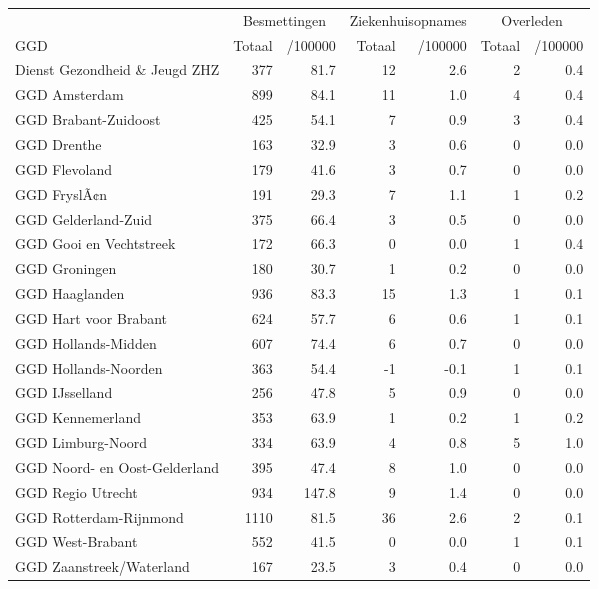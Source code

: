 \documentclass[
  english,
  man,floatsintext]{apa6}
\begin{document}
\begin{table}
\centering\begingroup\fontsize{10}{12}\selectfont

\begin{threeparttable}
\begin{tabular}{lrrrrrr}
\toprule
\multicolumn{1}{c}{ } & \multicolumn{2}{c}{Besmettingen} & \multicolumn{2}{c}{Ziekenhuisopnames} & \multicolumn{2}{c}{Overleden} \\
\cmidrule(l{3pt}r{3pt}){2-3} \cmidrule(l{3pt}r{3pt}){4-5} \cmidrule(l{3pt}r{3pt}){6-7}
GGD & Totaal & /100000 & Totaal & /100000 & Totaal & /100000\\
\midrule
Dienst Gezondheid \& Jeugd ZHZ & 377 & 81.7 & 12 & 2.6 & 2 & 0.4\\
GGD Amsterdam & 899 & 84.1 & 11 & 1.0 & 4 & 0.4\\
GGD Brabant-Zuidoost & 425 & 54.1 & 7 & 0.9 & 3 & 0.4\\
GGD Drenthe & 163 & 32.9 & 3 & 0.6 & 0 & 0.0\\
GGD Flevoland & 179 & 41.6 & 3 & 0.7 & 0 & 0.0\\
GGD FryslÃ¢n & 191 & 29.3 & 7 & 1.1 & 1 & 0.2\\
GGD Gelderland-Zuid & 375 & 66.4 & 3 & 0.5 & 0 & 0.0\\
GGD Gooi en Vechtstreek & 172 & 66.3 & 0 & 0.0 & 1 & 0.4\\
GGD Groningen & 180 & 30.7 & 1 & 0.2 & 0 & 0.0\\
GGD Haaglanden & 936 & 83.3 & 15 & 1.3 & 1 & 0.1\\
GGD Hart voor Brabant & 624 & 57.7 & 6 & 0.6 & 1 & 0.1\\
GGD Hollands-Midden & 607 & 74.4 & 6 & 0.7 & 0 & 0.0\\
GGD Hollands-Noorden & 363 & 54.4 & -1 & -0.1 & 1 & 0.1\\
GGD IJsselland & 256 & 47.8 & 5 & 0.9 & 0 & 0.0\\
GGD Kennemerland & 353 & 63.9 & 1 & 0.2 & 1 & 0.2\\
GGD Limburg-Noord & 334 & 63.9 & 4 & 0.8 & 5 & 1.0\\
GGD Noord- en Oost-Gelderland & 395 & 47.4 & 8 & 1.0 & 0 & 0.0\\
GGD Regio Utrecht & 934 & 147.8 & 9 & 1.4 & 0 & 0.0\\
GGD Rotterdam-Rijnmond & 1110 & 81.5 & 36 & 2.6 & 2 & 0.1\\
GGD West-Brabant & 552 & 41.5 & 0 & 0.0 & 1 & 0.1\\
GGD Zaanstreek/Waterland & 167 & 23.5 & 3 & 0.4 & 0 & 0.0\\

\end{tabular}
\end{threeparttable}
\end{table}
\end{document}
